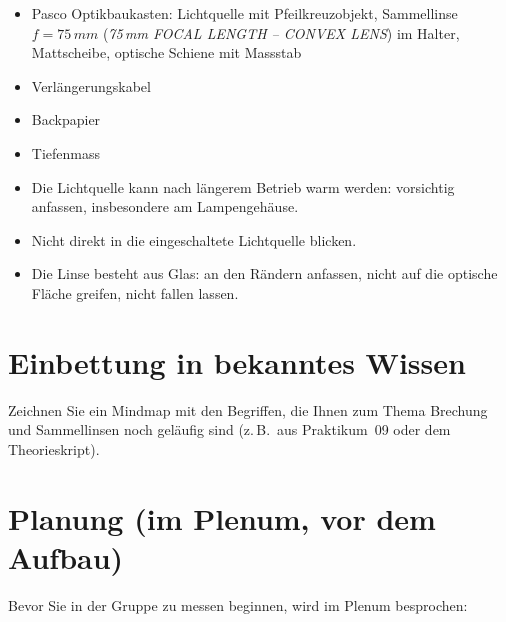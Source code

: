 \documentclass[11pt,a4paper]{article}
\newcommand{\SI}[2]{#1\,#2}
\newcommand{\milli}{m}
\newcommand{\meter}{m}
\newcommand{\zeichenraum}[1][4.5cm]{%
  \par\vspace{4pt}\noindent
  \fbox{\begin{minipage}[t][#1][t]{\dimexpr\linewidth-2\fboxsep-2\fboxrule}\ \end{minipage}}
  \vspace{4pt}
}
\begin{document}
\begin{itemize}[nosep]
  \item Pasco Optikbaukasten: Lichtquelle mit Pfeilkreuzobjekt, Sammellinse
    $f=\SI{75}{\milli\meter}$ (\emph{75\,mm FOCAL LENGTH -- CONVEX LENS}) im
    Halter, Mattscheibe, optische Schiene mit Massstab
  \item Verlängerungskabel
  \item Backpapier
  \item Tiefenmass
\end{itemize}

\begin{achtungbox}
\begin{itemize}[nosep]
  \item Die Lichtquelle kann nach längerem Betrieb warm werden: vorsichtig
    anfassen, insbesondere am Lampengehäuse.
  \item Nicht direkt in die eingeschaltete Lichtquelle blicken.
  \item Die Linse besteht aus Glas: an den Rändern anfassen, nicht auf die
    optische Fläche greifen, nicht fallen lassen.
\end{itemize}
\end{achtungbox}

\section{Einbettung in bekanntes Wissen}

\begin{aufgabebox}
Zeichnen Sie ein Mindmap mit den Begriffen, die Ihnen zum Thema Brechung und
Sammellinsen noch geläufig sind (z.\,B.\ aus Praktikum~09 oder dem
Theorieskript).
\end{aufgabebox}
\zeichenraum[4.5cm]

\section{Planung (im Plenum, vor dem Aufbau)}

\noindent Bevor Sie in der Gruppe zu messen beginnen, wird im Plenum
besprochen:
\end{document}
